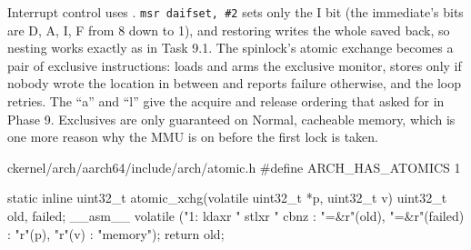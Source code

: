 \documentclass[11pt,a4paper]{article}
\begin{document}
Interrupt control uses . \texttt{msr daifset, \#2} sets only the I bit (the immediate's bits are D, A, I, F
from 8 down to 1), and restoring writes the whole saved  back, so nesting works exactly as in Task 9.1.
The spinlock's atomic exchange becomes a pair of exclusive instructions:  loads and arms the exclusive
monitor,  stores only if nobody wrote the location in between and reports failure otherwise, and the
loop retries. The ``a'' and ``l'' give the acquire and release ordering that  asked for in
Phase 9. Exclusives are only guaranteed on Normal, cacheable memory, which is one more reason why the MMU is on before
the first lock is taken.


\begin{lst}{c}{kernel/arch/aarch64/include/arch/atomic.h}
#define ARCH_HAS_ATOMICS 1

static inline uint32_t atomic_xchg(volatile uint32_t *p, uint32_t v)
{
    uint32_t old, failed;
    __asm__ volatile ("1: ldaxr %
                      "   stlxr %
                      "   cbnz  %
                      : "=&r"(old), "=&r"(failed) : "r"(p), "r"(v) : "memory");
    return old;
}
\end{lst}
\end{document}
